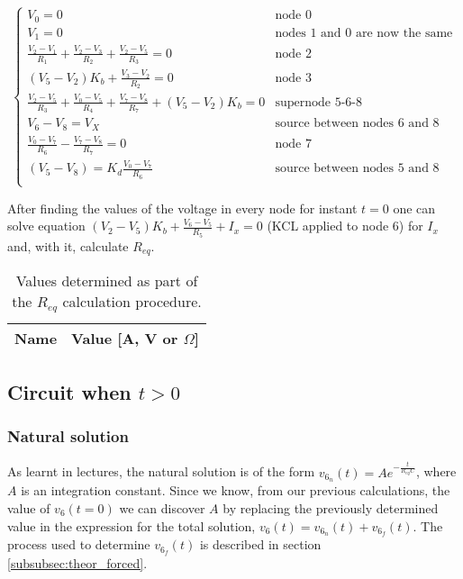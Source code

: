 \begin{equation}
  \begin{cases}
  V_0=0 & \mbox{node 0} \\
  V_1=0 & \mbox{nodes 1 and 0 are now the same} \\
  \frac{V_2-V_1}{R_1}+\frac{V_2-V_3}{R_2}+\frac{V_2-V_5}{R_3} = 0 & \mbox{node 2} \\
  (V_5-V_2)K_b + \frac{V_3-V_2}{R_2} = 0 & \mbox{node 3} \\
  \frac{V_2-V_5}{R_3} + \frac{V_0-V_5}{R_4} + \frac{V_7-V_8}{R_7} + (V_5-V_2)K_b = 0 & \mbox{supernode 5-6-8} \\ 
  V_6-V_8 = V_X & \mbox{source between nodes 6 and 8} \\
  \frac{V_0-V_7}{R_6} - \frac{V_7-V_8}{R_7} = 0 & \mbox{node 7} \\
  (V_5-V_8) = K_d \frac{V_0-V_7}{R_6} & \mbox{source between nodes 5 and 8} \\
  \end{cases}
\end{equation}

After finding the values of the voltage in every node for instant $t=0$ one can solve equation $(V_2-V_5)K_b + \frac{V_6-V_5}{R_5} + I_x = 0$ (KCL applied to node 6) for $I_x$ and, with it, calculate $R_{eq}$.


\begin{table}[H]
  \centering
  \begin{tabular}{|c|c|}
    \hline    
    {\bf Name} & {\bf Value [A, V or $\Omega$]} \\ \hline
    
  \end{tabular}
  \caption{Values determined as part of the $R_{eq}$ calculation procedure.}
  \label{tab:t=0}
\end{table}



\subsection{Circuit when $t>0$}

\subsubsection{Natural solution}  %
As learnt in lectures, the natural solution is of the form $v_{6_{n}}(t) = A e^{-\frac{t}{R_{eq}C}}$, where $A$ is an integration constant.
Since we know, from our previous calculations, the value of $v_{6}(t=0)$ we can discover $A$ by replacing the previously determined value in the expression for the total solution, $v_6(t) = v_{6_n}(t) + v_{6_f}(t)$. The process used to determine $v_{6_f}(t)$ is described in section \ref{subsubsec:theor_forced}. 

